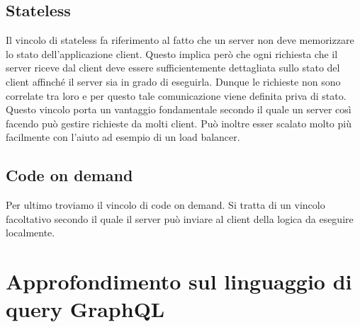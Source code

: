 \subsection*{Stateless}
Il vincolo di stateless fa riferimento al fatto che un server non deve memorizzare lo stato dell'applicazione client. Questo implica però che ogni richiesta che il server riceve dal client deve essere sufficientemente dettagliata sullo stato del client affinché il server sia in grado di eseguirla. Dunque le richieste non sono correlate tra loro e per questo tale comunicazione viene definita priva di stato. \\
Questo vincolo porta un vantaggio fondamentale secondo il quale un server così facendo può gestire richieste da molti client. Può inoltre esser scalato molto più facilmente con l'aiuto ad esempio di un load balancer.
\subsection*{Code on demand}
Per ultimo troviamo il vincolo di code on demand. Si tratta di un vincolo facoltativo secondo il quale il server può inviare al client della logica da eseguire localmente.
\section{Approfondimento sul linguaggio di query GraphQL}
